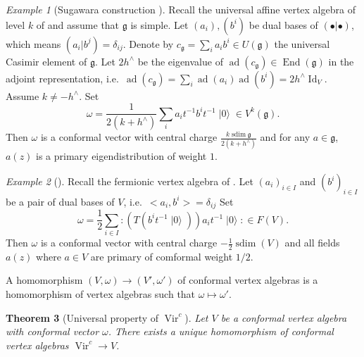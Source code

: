 \documentclass[a4paper, 12pt, reqno]{amsart}
\newtheorem{theorem}{Theorem}[subsection]
\theoremstyle{remark}
\newtheorem{example}[theorem]{Example}
\numberwithin{equation}{subsection}
\DeclareMathOperator{\Vir}{Vir}
\DeclareMathOperator{\Id}{Id}
\DeclareMathOperator{\End}{End}
\DeclareMathOperator{\vac}{|0\rangle}
\DeclareMathOperator{\ad}{ad}
\DeclareMathOperator{\sdim}{sdim}
\begin{document}
\begin{example}[Sugawara construction {\cite[Theorem 5.7]{kac_vertex_1998}}]
  \label{exa:9}
  Recall the universal affine vertex algebra of level $k$ of  and assume that $\mathfrak{g}$ is simple.
  Let $(a_i), (b^i)$ be dual bases of $(\bullet| \bullet)$, which means $(a_i| b^j) = \delta_{ij}$.
  Denote by $c_{\mathfrak{g}} = \sum_ia_ib^i \in U(\mathfrak{g})$ the universal Casimir element of $\mathfrak{g}$.
  Let $2h^{\wedge}$ be the eigenvalue of $\ad(c_{\mathfrak{g}}) \in \End(\mathfrak{g})$ in the adjoint representation, i.e.\ $\ad(c_{\mathfrak{g}}) = \sum_i\ad(a_i)\ad(b^i) = 2h^{\wedge}\Id_V$. 
  Assume $k \neq -h^\wedge$.
  Set
  \begin{equation*}
    \omega = \frac{1}{2(k + h^\wedge)}\sum_ia_it^{-1}b^it^{-1}\vac \in V^k(\mathfrak{g}).
  \end{equation*}
  Then $\omega$ is a conformal vector with central charge $\frac{k \sdim\mathfrak{g}}{2(k + h^\wedge)}$ and for any $a\in \mathfrak{g}$, $a(z)$ is a primary eigendistribution of weight $1$.
\end{example}

\begin{example}[{\cite[Proposition 4.10]{kac_vertex_1998}}]
  \label{exa:10}
  Recall the fermionic vertex algebra of .
  Let $(a_i)_{i \in I}$ and $(b^i)_{i \in I}$ be a pair of dual bases of $V$, i.e.\ $<a_i, b^i> = \delta_{ij}$
  Set
  \begin{equation*}
    \omega = \frac{1}{2}\sum_{i \in I}:(T(b^it^{-1}\vac))a_it^{-1}\vac:\in F(V).
  \end{equation*}
  Then $\omega$ is a conformal vector with central charge $-\frac{1}{2}\sdim(V)$ and all fields $a(z)$ where $a \in V$ are primary of comformal weight $1/2$.
\end{example}

A homomorphism $(V, \omega) \to (V', \omega')$ of conformal vertex algebras is a homomorphism of vertex algebras such that $\omega \mapsto \omega'$.

\begin{theorem}[Universal property of $\Vir^c$]
  \label{thr:19}
  Let $V$ be a conformal vertex algebra with conformal vector $\omega$.
  There exists a unique homomorphism of conformal vertex algebras $\Vir^c \to V$.
\end{theorem}
\end{document}
